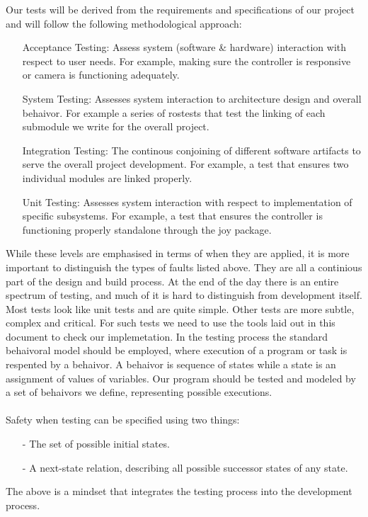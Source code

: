 \documentclass[english,12pt]{article}
\begin{document}
Our tests will be derived from the requirements and specifications of our project and will follow 
the following methodological approach:

\begin{itemize}
    \item[]Acceptance Testing: Assess system (software \& hardware) interaction with respect 
    to user needs. For example, making sure the controller is responsive or camera is functioning 
    adequately.
    \item[]System Testing: Assesses system interaction to architecture design and overall behaivor. 
    For example a series of rostests that test the linking of each submodule we write for the overall 
    project.
    \item[]Integration Testing: The continous conjoining of different software artifacts to 
    serve the overall project development. For example, a test that ensures two individual modules are 
    linked properly.
    \item[]Unit Testing: Assesses system interaction with respect to implementation of specific subsystems. 
    For example, a test that ensures the controller is functioning properly standalone through the joy 
    package.
\end{itemize}
While these levels are emphasised in terms of when they are applied, it is more important to distinguish 
the types of faults listed above. They are all a continious part of the design and build process. At 
the end of the day there is an entire spectrum of testing, and much of it is hard to distinguish from 
development itself. Most tests look like unit tests and are quite simple. Other tests are more subtle, 
complex and critical. For such tests we need to use the tools laid out in this document to check our 
implemetation. In the testing process the standard behaivoral model should be employed, where 
execution of a program or task is respented by a behaivor. A behaivor is sequence of states while a state 
is an assignment of values of variables. Our program should be tested and modeled by a set of behaivors 
we define, representing possible executions. \\\\
Safety when testing can be specified using two things:\\
\begin{itemize}
    \item[-] The set of possible initial states.
    \item[-] A next-state relation, describing all possible successor states of any state. 
\end{itemize}
The above is a mindset that integrates the testing process into the development process.
\end{document}

